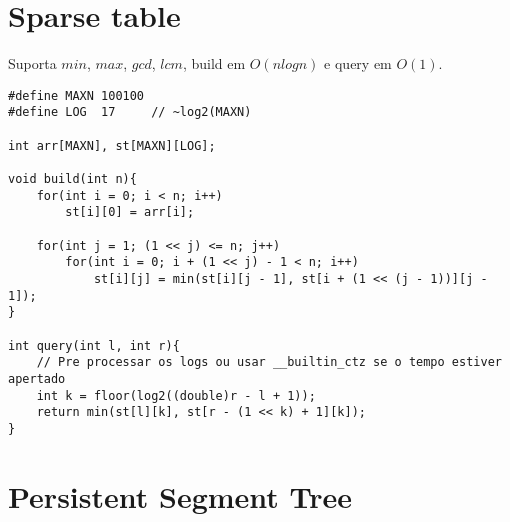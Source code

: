 \section{Sparse table}

Suporta $min$, $max$, $gcd$, $lcm$, build em $O(nlogn)$ e query em $O(1)$.
\begin{multicols}{2}
	\begin{lstlisting}
#define MAXN 100100
#define LOG  17     // ~log2(MAXN)

int arr[MAXN], st[MAXN][LOG];

void build(int n){
	for(int i = 0; i < n; i++)
		st[i][0] = arr[i];
	
	for(int j = 1; (1 << j) <= n; j++)
		for(int i = 0; i + (1 << j) - 1 < n; i++)
			st[i][j] = min(st[i][j - 1], st[i + (1 << (j - 1))][j - 1]);
}

int query(int l, int r){
	// Pre processar os logs ou usar __builtin_ctz se o tempo estiver apertado
	int k = floor(log2((double)r - l + 1));
	return min(st[l][k], st[r - (1 << k) + 1][k]);
}
\end{lstlisting}
\end{multicols}

\section{Persistent Segment Tree}

